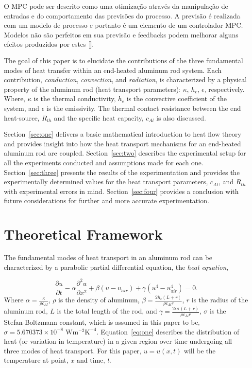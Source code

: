 \documentclass[10pt,aps,prb,twocolumn, nofootinbib]{revtex4-1}
\newcommand{\ut}{\ensuremath{\frac{\partial u}{\partial t}}}
\newcommand{\uxx}{\ensuremath{\frac{\partial^2 u}{\partial x^2}}}
\begin{document}
O MPC pode ser descrito como uma otimização através da manipulação de entradas e do comportamento das previsões do processo. A previsão é realizada com um modelo de processo e portanto é um elemento de um controlador MPC. Modelos não são perfeitos em sua previsão e feedbacks podem melhorar alguns efeitos produzidos por estes []. 

The goal of this paper is to elucidate the contributions of the three fundamental modes of heat transfer within an end-heated aluminum rod system. Each contribution, \textit{conduction}, \textit{convection}, and \textit{radiation}, is characterized by a physical property of the aluminum rod (heat transport parameters): $\kappa$, $h_c$, $\epsilon$, respectively. Where, $\kappa$ is the thermal conductivity, $h_c$ is the convective coefficient of the system, and $\epsilon$ is the emissivity. The thermal contact resistance between the end heat-source, $R_{th}$ and the specific heat capacity, $c_{Al}$ is also discussed. 
 
Section~\ref{sec:one} delivers a basic mathematical introduction to heat flow theory and provides insight into how the heat transport mechanisms for an end-heated aluminum rod are coupled. Section~\ref{sec:two} describes the experimental setup for all the experiments conducted and assumptions made for each one. Section~\ref{sec:three} presents the results of the experimentation and provides the experimentally determined values for the heat transport parameters, $c_{Al}$, and $R_{th}$ with experimental errors in mind. Section~\ref{sec:four} provides a conclusion with future considerations for further and more accurate experimentation.

\section{\label{sec:one}Theoretical Framework}
The fundamental modes of heat transport in an aluminum rod can be characterized by a parabolic partial differential equation, the \emph{heat equation},

\begin{equation}
\label{eq:one}
\ut - \alpha \uxx + \beta (u-u_{air}) + \gamma (u^4 - u_{air}^4)  = 0.
\end{equation} 
Where $\alpha = \frac{\kappa}{\rho c_{Al}}$, $\rho$ is the density of aluminum, $\beta = \frac{2h_c(L+r)}{\rho c_{Al} r}$, $r$ is the radius of the aluminum rod, $L$ is the total length of the rod, and $\gamma = \frac{2\epsilon \sigma(L+r)}{\rho c_{Al} r}$, $\sigma$ is the Stefan-Boltzmann constant, which is assumed in this paper to be, $\sigma = 5.670373 \times 10^{-8} \text{ W}\text{m}^{-2}\text{K}^{-4}$. Equation~\ref{eq:one} describes the distribution of heat (or variation in temperature) in a given region over time undergoing all three modes of heat transport. For this paper, $u = u(x,t)$ will be the temperature at point, $x$ and time, $t$. 
\end{document}
